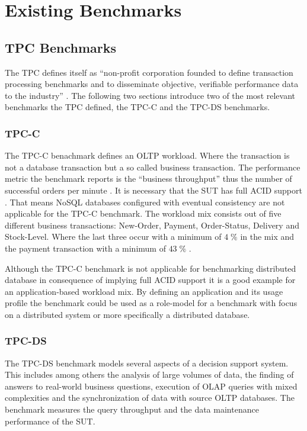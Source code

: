 
\chapter{Existing Benchmarks}
\label{cha:analysis}

\section{TPC Benchmarks}
\label{sec:tpc}
The \acf{TPC} defines itself as \enquote{non-profit corporation founded to define transaction processing benchmarks and to disseminate objective, verifiable performance data to the industry} \cite[10]{tpc.2013}. The following two sections introduce two of the most relevant benchmarks the \ac{TPC} defined, the \ac{TPC}-C and the \ac{TPC}-DS benchmarks. 

\subsection{TPC-C}
\label{subsec:tpc-c}
The \ac{TPC}-C benachmark defines an \acf{OLTP} workload. Where the transaction is not a database transaction but a so called business transaction. The performance metric the benchmark reports is the \enquote{business throughput} thus the number of successful orders per minute \cite[7]{tpcc.2010}. It is necessary that the \ac{SUT} has full ACID support \cite[47]{tpcc.2010}. That means NoSQL databases configured with eventual consistency are not applicable for the \ac{TPC}-C benchmark. The workload mix consists out of five different business transactions: New-Order, Payment, Order-Status, Delivery and Stock-Level. Where the last three occur with a minimum of $4\;\%$ in the mix and the payment transaction with a minimum of $43\;\%$ \cite[70]{tpcc.2010}.

Although the \ac{TPC}-C benchmark is not applicable for benchmarking distributed database in consequence of implying full ACID support it is a good example for an application-based workload mix. By defining an application and its usage profile the benchmark could be used as a role-model for a benchmark with focus on a distributed system or more specifically a distributed database.

\subsection{TPC-DS}
\label{subsec:tpc-ds}
The \ac{TPC}-DS benchmark models several aspects of a decision support system. This includes among others the analysis of large volumes of data, the finding of answers to real-world business questions, execution of \acf{OLAP} queries with mixed complexities and the synchronization of data with source \ac{OLTP} databases. The benchmark measures the query throughput and the data maintenance performance of the \ac{SUT}. \cite[7]{tpcds.2012}

